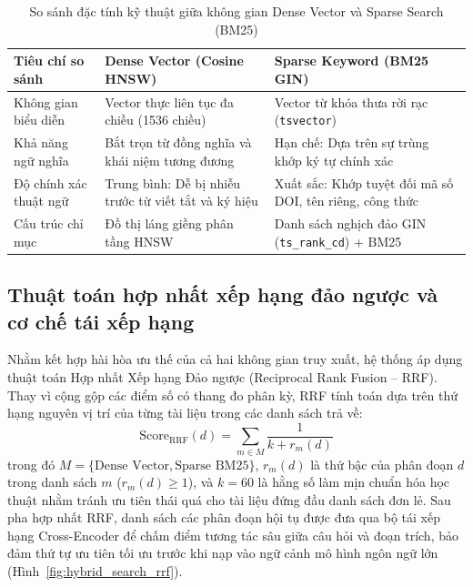 \begin{table}[!htbp]
\centering
\caption{So sánh đặc tính kỹ thuật giữa không gian Dense Vector và Sparse Search (BM25)}
\label{tab:search_comparison}
\setlength{\tabcolsep}{5pt}
\renewcommand{\arraystretch}{1.20}
\begin{tabularx}{\textwidth}{|>{\raggedright\arraybackslash}p{3.0cm}|X|X|}
\hline
\textbf{Tiêu chí so sánh} & \textbf{Dense Vector (Cosine HNSW)} & \textbf{Sparse Keyword (BM25 GIN)} \\
\hline
Không gian biểu diễn & Vector thực liên tục đa chiều (1536 chiều) & Vector từ khóa thưa rời rạc (\texttt{tsvector}) \\
\hline
Khả năng ngữ nghĩa & Bắt trọn từ đồng nghĩa và khái niệm tương đương & Hạn chế: Dựa trên sự trùng khớp ký tự chính xác \\
\hline
Độ chính xác thuật ngữ & Trung bình: Dễ bị nhiễu trước từ viết tắt và ký hiệu & Xuất sắc: Khớp tuyệt đối mã số DOI, tên riêng, công thức \\
\hline
Cấu trúc chỉ mục & Đồ thị láng giềng phân tầng HNSW & Danh sách nghịch đảo GIN (\texttt{ts\_rank\_cd}) + BM25 \\
\hline
\end{tabularx}
\end{table}

\subsection{Thuật toán hợp nhất xếp hạng đảo ngược và cơ chế tái xếp hạng}
\label{subsec:rrf_rerank}
Nhằm kết hợp hài hòa ưu thế của cả hai không gian truy xuất, hệ thống áp dụng thuật toán Hợp nhất Xếp hạng Đảo ngược (Reciprocal Rank Fusion -- RRF). Thay vì cộng gộp các điểm số có thang đo phân kỳ, RRF tính toán dựa trên thứ hạng nguyên vị trí của từng tài liệu trong các danh sách trả về:
\begin{equation}
\label{eq:rrf_calc}
\text{Score}_{\text{RRF}}(d) = \sum_{m \in M} \frac{1}{k + r_m(d)}
\end{equation}
trong đó $M = \{\text{Dense Vector}, \text{Sparse BM25}\}$, $r_m(d)$ là thứ bậc của phân đoạn $d$ trong danh sách $m$ ($r_m(d) \ge 1$), và $k = 60$ là hằng số làm mịn chuẩn hóa học thuật nhằm tránh ưu tiên thái quá cho tài liệu đứng đầu danh sách đơn lẻ. Sau pha hợp nhất RRF, danh sách các phân đoạn hội tụ được đưa qua bộ tái xếp hạng Cross-Encoder để chấm điểm tương tác sâu giữa câu hỏi và đoạn trích, bảo đảm thứ tự ưu tiên tối ưu trước khi nạp vào ngữ cảnh mô hình ngôn ngữ lớn (Hình~\ref{fig:hybrid_search_rrf}).

